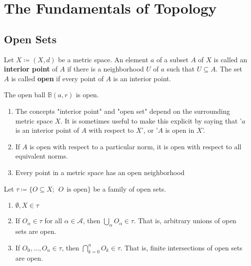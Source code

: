 \chapter{The Fundamentals of Topology}

\section{Open Sets}
\begin{definition}
    Let \(X \coloneqq \left(X, d\right)\) be a metric space. An element \(a\) of a subset
    \(A\) of \(X\) is called an \textbf{interior point} of \(A\) if there is a neighborhood
    \(U\) of \(a\) such that \(U \subseteq A\). The set \(A\) is called \textbf{open} 
    if every point of \(A\) is an interior point.    
\end{definition}

\begin{eg}
    The open ball \(\mathbb{B}\left(a, r\right)\) is open. 
\end{eg}

\begin{remark}
    \begin{enumerate}[label=(\alph*)]
        \item The concepts "interior point" and "open set" depend on the surrounding metric 
        space \(X\). It is sometimes useful to make this explicit by saying that '\(a\) is 
        an interior point of \(A\) with respect to \(X\)', or '\(A\) is open in \(X\)'. 
        
        \item If \(A\) is open with respect to a particular norm, it is open with respect 
        to all equivalent norms. 
        \item Every point in a metric space has an open neighborhood
    \end{enumerate}
\end{remark}

\begin{proposition}
    Let \(\tau \coloneqq \{O \subseteq X; \:\: O \:\: \text{is open}\} \) be a family of open sets. 
    \begin{enumerate}[label=(\roman*)]
        \item \(\emptyset, X \in \tau\)
        \item If \(O_\alpha \in \tau\) for all \(\alpha \in \mathcal{A}\), then \(\bigcup_\alpha O_\alpha \in \tau\). 
        That is, arbitrary unions of open sets are open. 
        \item If \(O_0, \ldots, O_n \in \tau\), then \(\bigcap^n_{k=0}O_k \in \tau\). That is,
        finite intersections of open sets are open. 
    \end{enumerate}
\end{proposition}

